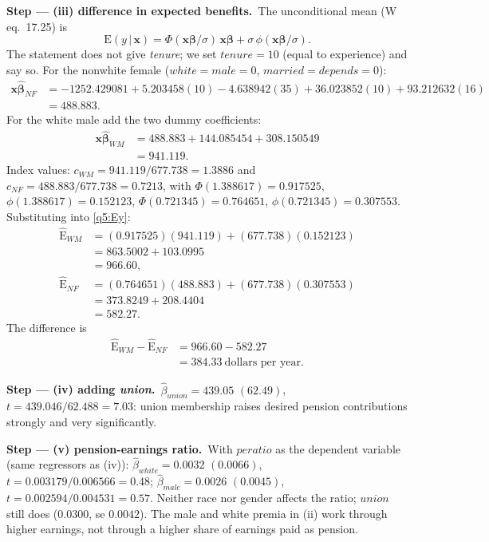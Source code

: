 \documentclass[11pt,a4paper]{article}
\numberwithin{equation}{questao}
\newcommand{\passo}[2]{\par\smallskip\noindent\textbf{Step --- #1.}~#2}
\newcommand{\var}[1]{\mathit{#1}}
\newcommand{\E}{\mathrm{E}}
\begin{document}
\begin{sol}
\passo{(iii) difference in expected benefits}{The unconditional mean (W eq.~17.25) is
\begin{equation}
\E(y\,|\,\mathbf{x})=\Phi(\mathbf{x}\boldsymbol\beta/\sigma)\,\mathbf{x}\boldsymbol\beta+\sigma\,\phi(\mathbf{x}\boldsymbol\beta/\sigma). \label{q5:Ey}
\end{equation}
The statement does not give \textit{tenure}; we set $\var{tenure}=10$ (equal to experience) and say so.
For the nonwhite female ($\var{white}=\var{male}=0$, $\var{married}=\var{depends}=0$):
\begin{align*}
\mathbf{x}\hat{\boldsymbol\beta}_{NF}&=-1252.429081+5.203458(10)-4.638942(35)+36.023852(10)+93.212632(16)\\
&=488.883 .
\end{align*}
For the white male add the two dummy coefficients:
\begin{align*}
\mathbf{x}\hat{\boldsymbol\beta}_{WM}&=488.883+144.085454+308.150549\\
&=941.119 .
\end{align*}
Index values: $c_{WM}=941.119/677.738=1.3886$ and $c_{NF}=488.883/677.738=0.7213$, with
$\Phi(1.388617)=0.917525$, $\phi(1.388617)=0.152123$, $\Phi(0.721345)=0.764651$,
$\phi(0.721345)=0.307553$. Substituting into \eqref{q5:Ey}:
\begin{align*}
\widehat{\E}_{WM}&=(0.917525)(941.119)+(677.738)(0.152123)\\
&=863.5002+103.0995\\
&=966.60,\\
\widehat{\E}_{NF}&=(0.764651)(488.883)+(677.738)(0.307553)\\
&=373.8249+208.4404\\
&=582.27 .
\end{align*}
The difference is
\begin{align*}
\widehat{\E}_{WM}-\widehat{\E}_{NF}&=966.60-582.27\\
&=384.33\ \text{dollars per year}.
\end{align*}}

\passo{(iv) adding \textit{union}}{$\hat\beta_{\var{union}}=439.05$ $(62.49)$, $t=439.046/62.488=7.03$: union
membership raises desired pension contributions strongly and very significantly.}

\passo{(v) pension-earnings ratio}{With $\var{peratio}$ as the dependent variable (same regressors as (iv)):
$\hat\beta_{\var{white}}=0.0032$ $(0.0066)$, $t=0.003179/0.006566=0.48$; $\hat\beta_{\var{male}}=0.0026$
$(0.0045)$, $t=0.002594/0.004531=0.57$. Neither race nor gender affects the ratio; $\var{union}$ still does
($0.0300$, se $0.0042$). The male and white premia in (ii) work through higher earnings, not through a
higher share of earnings paid as pension.}


\end{sol}
\end{document}

